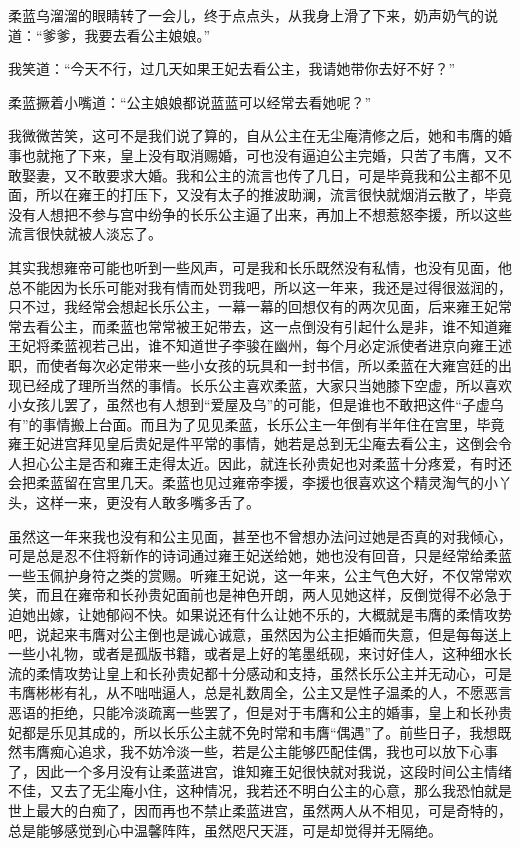 柔蓝乌溜溜的眼睛转了一会儿，终于点点头，从我身上滑了下来，奶声奶气的说道：“爹爹，我要去看公主娘娘。”

我笑道：“今天不行，过几天如果王妃去看公主，我请她带你去好不好？”

柔蓝撅着小嘴道：“公主娘娘都说蓝蓝可以经常去看她呢？”

我微微苦笑，这可不是我们说了算的，自从公主在无尘庵清修之后，她和韦膺的婚事也就拖了下来，皇上没有取消赐婚，可也没有逼迫公主完婚，只苦了韦膺，又不敢娶妻，又不敢要求大婚。我和公主的流言也传了几日，可是毕竟我和公主都不见面，所以在雍王的打压下，又没有太子的推波助澜，流言很快就烟消云散了，毕竟没有人想把不参与宫中纷争的长乐公主逼了出来，再加上不想惹怒李援，所以这些流言很快就被人淡忘了。

其实我想雍帝可能也听到一些风声，可是我和长乐既然没有私情，也没有见面，他总不能因为长乐可能对我有情而处罚我吧，所以这一年来，我还是过得很滋润的，只不过，我经常会想起长乐公主，一幕一幕的回想仅有的两次见面，后来雍王妃常常去看公主，而柔蓝也常常被王妃带去，这一点倒没有引起什么是非，谁不知道雍王妃将柔蓝视若己出，谁不知道世子李骏在幽州，每个月必定派使者进京向雍王述职，而使者每次必定带来一些小女孩的玩具和一封书信，所以柔蓝在大雍宫廷的出现已经成了理所当然的事情。长乐公主喜欢柔蓝，大家只当她膝下空虚，所以喜欢小女孩儿罢了，虽然也有人想到“爱屋及乌”的可能，但是谁也不敢把这件“子虚乌有”的事情搬上台面。而且为了见见柔蓝，长乐公主一年倒有半年住在宫里，毕竟雍王妃进宫拜见皇后贵妃是件平常的事情，她若是总到无尘庵去看公主，这倒会令人担心公主是否和雍王走得太近。因此，就连长孙贵妃也对柔蓝十分疼爱，有时还会把柔蓝留在宫里几天。柔蓝也见过雍帝李援，李援也很喜欢这个精灵淘气的小丫头，这样一来，更没有人敢多嘴多舌了。

虽然这一年来我也没有和公主见面，甚至也不曾想办法问过她是否真的对我倾心，可是总是忍不住将新作的诗词通过雍王妃送给她，她也没有回音，只是经常给柔蓝一些玉佩护身符之类的赏赐。听雍王妃说，这一年来，公主气色大好，不仅常常欢笑，而且在雍帝和长孙贵妃面前也是神色开朗，两人见她这样，反倒觉得不必急于迫她出嫁，让她郁闷不快。如果说还有什么让她不乐的，大概就是韦膺的柔情攻势吧，说起来韦膺对公主倒也是诚心诚意，虽然因为公主拒婚而失意，但是每每送上一些小礼物，或者是孤版书籍，或者是上好的笔墨纸砚，来讨好佳人，这种细水长流的柔情攻势让皇上和长孙贵妃都十分感动和支持，虽然长乐公主并无动心，可是韦膺彬彬有礼，从不咄咄逼人，总是礼数周全，公主又是性子温柔的人，不愿恶言恶语的拒绝，只能冷淡疏离一些罢了，但是对于韦膺和公主的婚事，皇上和长孙贵妃都是乐见其成的，所以长乐公主就不免时常和韦膺“偶遇”了。前些日子，我想既然韦膺痴心追求，我不妨冷淡一些，若是公主能够匹配佳偶，我也可以放下心事了，因此一个多月没有让柔蓝进宫，谁知雍王妃很快就对我说，这段时间公主情绪不佳，又去了无尘庵小住，这种情况，我若还不明白公主的心意，那么我恐怕就是世上最大的白痴了，因而再也不禁止柔蓝进宫，虽然两人从不相见，可是奇特的，总是能够感觉到心中温馨阵阵，虽然咫尺天涯，可是却觉得并无隔绝。


